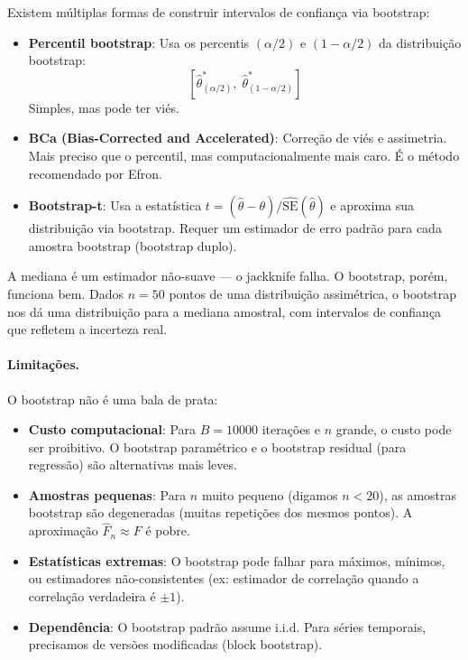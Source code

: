 \documentclass{tufte-handout}
\begin{document}
Existem múltiplas formas de construir intervalos de confiança via bootstrap:

\begin{itemize}
    \item \textbf{Percentil bootstrap}: Usa os percentis $(\alpha/2)$ e $(1-\alpha/2)$ da distribuição bootstrap:
    \[
    [\hat{\theta}_{(\alpha/2)}^*, \; \hat{\theta}_{(1-\alpha/2)}^*]
    \]
    Simples, mas pode ter viés.

    \item \textbf{BCa (Bias-Corrected and Accelerated)}: Correção de viés e assimetria. Mais preciso que o percentil, mas computacionalmente mais caro. É o método recomendado por Efron.

    \item \textbf{Bootstrap-t}: Usa a estatística $t = (\hat{\theta} - \theta)/\widehat{\text{SE}}(\hat{\theta})$ e aproxima sua distribuição via bootstrap. Requer um estimador de erro padrão para cada amostra bootstrap (bootstrap duplo).
\end{itemize}

\begin{exmp}
    A mediana é um estimador não-suave --- o jackknife falha. O bootstrap, porém, funciona bem. Dados $n = 50$ pontos de uma distribuição assimétrica, o bootstrap nos dá uma distribuição para a mediana amostral, com intervalos de confiança que refletem a incerteza real.
\end{exmp}

\paragraph{Limitações.}

O bootstrap não é uma bala de prata:

\begin{itemize}
    \item \textbf{Custo computacional}: Para $B = 10000$ iterações e $n$ grande, o custo pode ser proibitivo. O bootstrap paramétrico e o bootstrap residual (para regressão) são alternativas mais leves.
    \item \textbf{Amostras pequenas}: Para $n$ muito pequeno (digamos $n < 20$), as amostras bootstrap são degeneradas (muitas repetições dos mesmos pontos). A aproximação $\hat{F}_n \approx F$ é pobre.
    \item \textbf{Estatísticas extremas}: O bootstrap pode falhar para máximos, mínimos, ou estimadores não-consistentes (ex: estimador de correlação quando a correlação verdadeira é $\pm 1$).
    \item \textbf{Dependência}: O bootstrap padrão assume i.i.d. Para séries temporais, precisamos de versões modificadas (block bootstrap).
\end{itemize}
\end{document}
